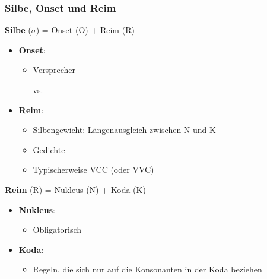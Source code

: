 \begin{frame}
\frametitle{Silbe, Onset und Reim}

\textbf{Silbe} ($\sigma$) = Onset (O) + Reim (R)

\begin{itemize}
	\item \textbf{Onset}: 
	\begin{itemize}
		\item Versprecher
	
	          \ea
                   vs. 
                  \z

	\end{itemize}	
			
	\item \textbf{Reim}: 
	\begin{itemize}
		\item Silbengewicht: Längenausgleich zwischen N und K 		



		\item Gedichte
		\item Typischerweise VCC (oder VVC)
	\end{itemize}
	
\end{itemize}

\textbf{Reim} (R) = Nukleus (N) + Koda (K)

\begin{itemize}
	\item \textbf{Nukleus}: 
	\begin{itemize}
		\item Obligatorisch
	\end{itemize}	
			
	\item \textbf{Koda}: 
	\begin{itemize}
		\item Regeln, die sich nur auf die Konsonanten in der Koda beziehen
	\end{itemize}
	
\end{itemize}

\end{frame}



